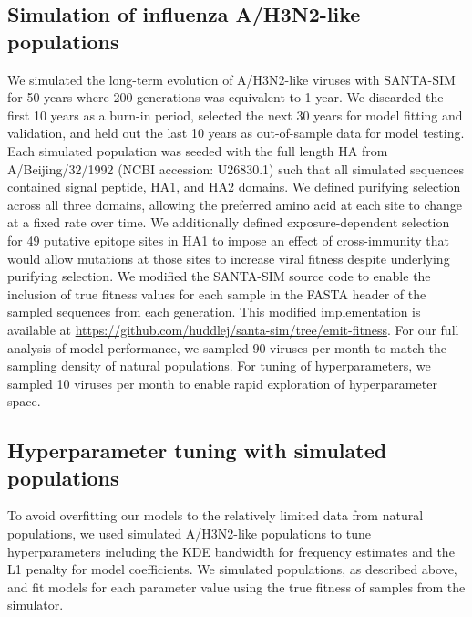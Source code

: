 \subsection*{Simulation of influenza A/H3N2-like populations}

We simulated the long-term evolution of A/H3N2-like viruses with SANTA-SIM \cite{Jariani2019} for 50 years where 200 generations was equivalent to 1 year.
We discarded the first 10 years as a burn-in period, selected the next 30 years for model fitting and validation, and held out the last 10 years as out-of-sample data for model testing.
Each simulated population was seeded with the full length HA from A/Beijing/32/1992 (NCBI accession: U26830.1) such that all simulated sequences contained signal peptide, HA1, and HA2 domains.
We defined purifying selection across all three domains, allowing the preferred amino acid at each site to change at a fixed rate over time.
We additionally defined exposure-dependent selection for 49 putative epitope sites in HA1 \cite{Luksza:2014hj} to impose an effect of cross-immunity that would allow mutations at those sites to increase viral fitness despite underlying purifying selection.
We modified the SANTA-SIM source code to enable the inclusion of true fitness values for each sample in the FASTA header of the sampled sequences from each generation.
This modified implementation is available at \url{https://github.com/huddlej/santa-sim/tree/emit-fitness}.
For our full analysis of model performance, we sampled 90 viruses per month to match the sampling density of natural populations.
For tuning of hyperparameters, we sampled 10 viruses per month to enable rapid exploration of hyperparameter space.

\subsection*{Hyperparameter tuning with simulated populations}

To avoid overfitting our models to the relatively limited data from natural populations, we used simulated A/H3N2-like populations to tune hyperparameters including the KDE bandwidth for frequency estimates and the L1 penalty for model coefficients.
We simulated populations, as described above, and fit models for each parameter value using the true fitness of samples from the simulator.

